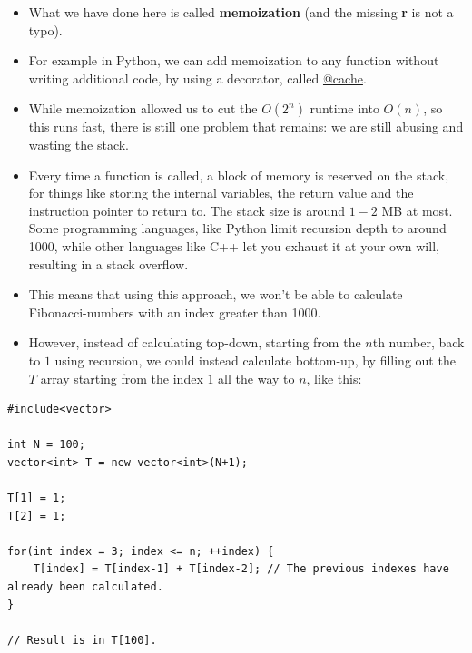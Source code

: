 \begin{itemize}
    \item What we have done here is called \textbf{memoization} (and the missing \textbf{r} is not a typo).
    \item For example in Python, we can add memoization to any function without writing additional code, by using a decorator, called \href{https://docs.python.org/3/library/functools.html#functools.cache}{@cache}.
    \item While memoization allowed us to cut the $O(2^n)$ runtime into $O(n)$, so this runs fast, there is still one problem that remains: we are still abusing and wasting the stack.
    \item Every time a function is called, a block of memory is reserved on the stack, for things like storing the internal variables, the return value and the instruction pointer to return to. The stack size is around $1-2$ MB at most. Some programming languages, like Python limit recursion depth to around 1000, while other languages like C++ let you exhaust it at your own will, resulting in a stack overflow.
    \item This means that using this approach, we won't be able to calculate Fibonacci-numbers with an index greater than 1000.
    \item However, instead of calculating top-down, starting from the $n$th number, back to $1$ using recursion, we could instead calculate bottom-up, by filling out the $T$ array starting from the index $1$ all the way to $n$, like this:
\end{itemize}


\begin{verbatim}
#include<vector>

int N = 100;
vector<int> T = new vector<int>(N+1);

T[1] = 1;
T[2] = 1;

for(int index = 3; index <= n; ++index) {
    T[index] = T[index-1] + T[index-2]; // The previous indexes have already been calculated.
}

// Result is in T[100].
\end{verbatim}


